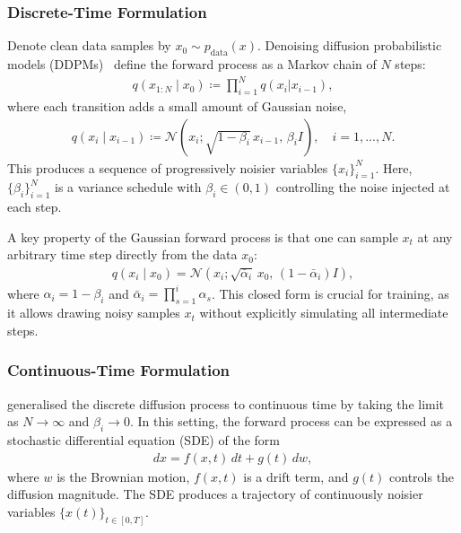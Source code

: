 \documentclass[a4paper,12pt]{article}
\begin{document}
\subsubsection{Discrete-Time Formulation}
Denote clean data samples by \(x_0 \sim p_{\text{data}}(x)\). Denoising diffusion probabilistic models (DDPMs)~\citep{hoDenoisingDiffusionProbabilistic2020} define the forward process as a Markov chain of \(N\) steps:
\begin{align*}
    q\left(x_{1:N}\mid x_0\right)\coloneq\prod_{i=1}^{N}q\left(x_i|x_{i-1}\right),
\end{align*}
where each transition adds a small amount of Gaussian noise,
\begin{align}\label{eq:DDPM-transition-kernel}
    q\left(x_i \mid x_{i-1}\right)\coloneq\mathcal{N}\!\left(x_i ; \sqrt{1-\beta_i}\,x_{i-1}, \, \beta_i I \right),\quad i=1,...,N.
\end{align}
This produces a sequence of progressively noisier variables \(\{x_i\}_{i=1}^N\). Here, \(\{\beta_i\}_{i=1}^N\) is a variance schedule with \(\beta_i \in (0,1)\) controlling the noise injected at each step.

A key property of the Gaussian forward process is that one can sample \(x_t\) at any arbitrary time step directly from the data \(x_0\):
\begin{align}\label{eq:DDPM-solution}
    q\left(x_i \mid x_0\right) = \mathcal{N}\!\left(x_i ; \sqrt{\bar \alpha_i}\,x_0, \,(1-\bar \alpha_i) I \right),
\end{align}
where \(\alpha_i = 1 - \beta_i\) and \(\bar \alpha_i = \prod_{s=1}^i \alpha_s\). This closed form is crucial for training, as it allows drawing noisy samples \(x_t\) without explicitly simulating all intermediate steps.

\subsubsection{Continuous-Time Formulation}\label{sec:forward-SDE-continuous}
\citet{song2021ScoreBasedGenerativeModeling} generalised the discrete diffusion process to continuous time by taking the limit as \(N \to \infty\) and \(\beta_i \to 0\). In this setting, the forward process can be expressed as a stochastic differential equation (SDE) of the form
\begin{align}\label{eq:forward_sde}
    dx = f(x,t)\,dt + g(t)\,dw,
\end{align}
where \(w\) is the Brownian motion, \(f(x,t)\) is a drift term, and \(g(t)\) controls the diffusion magnitude. The SDE produces a trajectory of continuously noisier variables \(\{x(t)\}_{t \in [0,T]}\).
\end{document}
